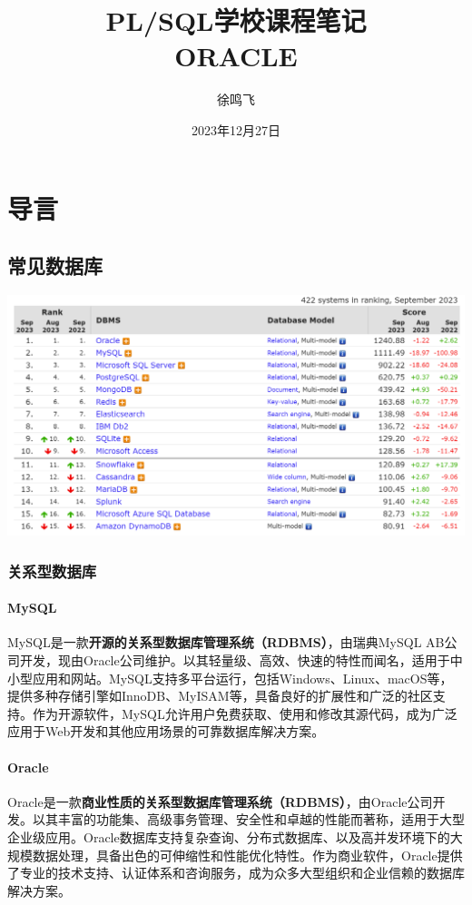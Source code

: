 \documentclass[11pt, a4paper, oneside, UTF8]{ctexbook}
\title{{\Huge{\textbf{PL/SQL学校课程笔记}}}\\ORACLE}
\author{徐鸣飞}
\date{2023年12月27日}
\begin{document}
\maketitle

\newpage                    %
\setcounter{page}{1}        %
\tableofcontents            %

\newpage                    %
\setcounter{page}{1}        %

\chapter{导言}
\section{常见数据库}
\includegraphics[width=0.9\linewidth]{picture/数据库占比对比.png}
\subsection{关系型数据库}
\subsubsection{MySQL}
MySQL是一款\textbf{开源的关系型数据库管理系统（RDBMS）}，由瑞典MySQL AB公司开发，现由Oracle公司维护。以其轻量级、高效、快速的特性而闻名，适用于中小型应用和网站。MySQL支持多平台运行，包括Windows、Linux、macOS等，提供多种存储引擎如InnoDB、MyISAM等，具备良好的扩展性和广泛的社区支持。作为开源软件，MySQL允许用户免费获取、使用和修改其源代码，成为广泛应用于Web开发和其他应用场景的可靠数据库解决方案。
\subsubsection{Oracle}
Oracle是一款\textbf{商业性质的关系型数据库管理系统（RDBMS）}，由Oracle公司开发。以其丰富的功能集、高级事务管理、安全性和卓越的性能而著称，适用于大型企业级应用。Oracle数据库支持复杂查询、分布式数据库、以及高并发环境下的大规模数据处理，具备出色的可伸缩性和性能优化特性。作为商业软件，Oracle提供了专业的技术支持、认证体系和咨询服务，成为众多大型组织和企业信赖的数据库解决方案。
\end{document}
